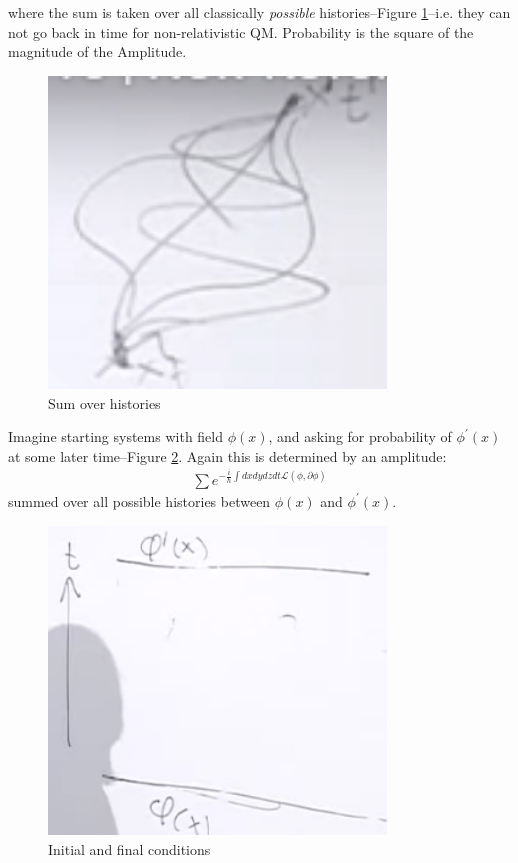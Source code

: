 \documentclass[]{article}
\begin{document}
where the sum is taken over all classically \emph{possible} histories--Figure \ref{fig:sum:histories}--i.e. they can not go back in time for non-relativistic QM. Probability is the square of the magnitude of the Amplitude.

\begin{figure}[H]
	\caption{Sum over histories}\label{fig:sum:histories}
	\includegraphics[width=0.8\textwidth]{sum-histories}
\end{figure}



Imagine starting systems with field $\phi(x)$, and asking for probability of $\phi^\prime(x)$ at some later time--Figure \ref{fig:path-integral1}. Again this is determined by an amplitude:
\begin{align*}
	\sum e^{-\frac{i}{\hslash} \int dx dy dz dt\mathcal{L}(\phi,\partial \phi) }
\end{align*}
summed over all possible histories between $\phi(x)$ and $\phi^\prime(x)$.

\begin{figure}[H]
	\caption{Initial and final conditions}\label{fig:path-integral1}
	\includegraphics[width=0.8\textwidth]{path-integral1}
\end{figure}
\end{document}
